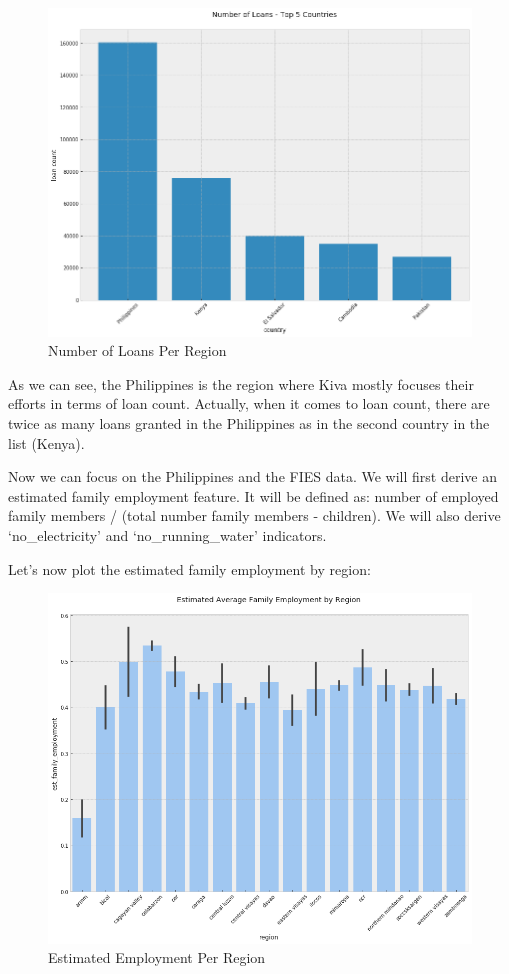 \documentclass{article}
\begin{document}
\begin{figure}[H]
\caption{Number of Loans Per Region}
\centering
\includegraphics[width = 0.7 \textwidth]{loan_regions}
\end{figure}

As we can see, the Philippines is the region where Kiva mostly focuses their efforts in terms of loan count. Actually, when it comes to loan count, there are twice as many loans granted in the Philippines as in the second country in the list (Kenya).

Now we can focus on the Philippines and the FIES data. We will first derive an estimated family employment feature. It will be defined as: number of employed family members / (total number family members - children). We will also derive ‘no\_electricity’ and ‘no\_running\_water’ indicators.

Let's now plot the estimated family employment by region:

\begin{figure}[H]
\caption{Estimated Employment Per Region}
\centering
\includegraphics[width = 0.7 \textwidth]{empl_region}
\end{figure}
\end{document}
